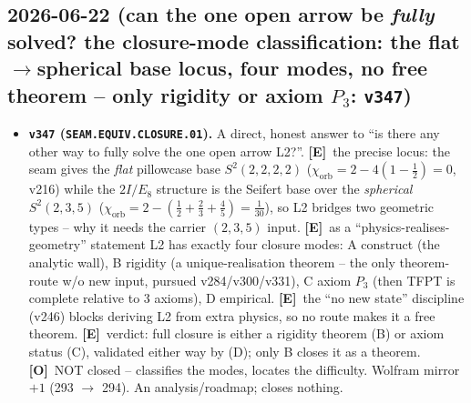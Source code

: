 \documentclass[11pt]{article}
\providecommand{\mE}{\textbf{[E]}}\providecommand{\mC}{\textbf{[C]}}
\providecommand{\mO}{\textbf{[O]}}\providecommand{\mX}{\textbf{[X]}}
\begin{document}
\subsection*{2026-06-22 (can the one open arrow be \emph{fully} solved? the closure-mode classification: the flat$\to$spherical base locus, four modes, no free theorem -- only rigidity or axiom $P_3$: \texttt{v347})}
\begin{itemize}
\item \textbf{\texttt{v347} (\texttt{SEAM.EQUIV.CLOSURE.01}).} A direct, honest answer to ``is there any other way
to fully solve the one open arrow L2?''. \mE\ the precise locus: the seam gives the \emph{flat} pillowcase base
$S^2(2,2,2,2)$ ($\chi_{\mathrm{orb}}=2-4(1-\tfrac12)=0$, v216) while the $2I/E_8$ structure is the Seifert base over
the \emph{spherical} $S^2(2,3,5)$ ($\chi_{\mathrm{orb}}=2-(\tfrac12+\tfrac23+\tfrac45)=\tfrac1{30}$), so L2 bridges
two geometric types -- why it needs the carrier $(2,3,5)$ input. \mE\ as a ``physics-realises-geometry'' statement
L2 has exactly four closure modes: A construct (the analytic wall), B rigidity (a unique-realisation theorem --
the only theorem-route w/o new input, pursued v284/v300/v331), C axiom $P_3$ (then TFPT is complete relative to 3
axioms), D empirical. \mE\ the ``no new state'' discipline (v246) blocks deriving L2 from extra physics, so no route
makes it a free theorem. \mE\ verdict: full closure is either a rigidity theorem (B) or axiom status (C), validated
either way by (D); only B closes it as a theorem. \mO\ NOT closed -- classifies the modes, locates the difficulty.
Wolfram mirror $+1$ (293 $\to$ 294). An analysis/roadmap; closes nothing.
\end{itemize}
\end{document}
